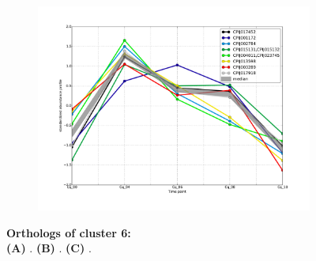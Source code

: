 \begin{figure}[hp]
\begin{subfigure}[t]{.5\linewidth}
\includegraphics[width=\linewidth]{figures/figs/ecr_and_insects_ptci_20130903/upAt4_gene_profiles_from_cummerbund/Cq_upAt4_cls6_Ag_target_FPKMs_vb_orthos.pdf}
\caption{}
\label{fig:cluster6-Cq}
\end{subfigure}
% 
\caption[Orthologs of cluster 6]{\sf \textbf{Orthologs of cluster 6:}\\

\textbf{(A)} \Aa.
\textbf{(B)} \Ag.
\textbf{(C)} \Cq.
}
\label{fig:cluster6}
\end{figure}